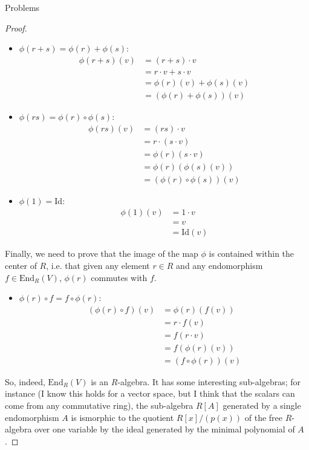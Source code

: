 \documentclass[12pt]{article}
\theoremstyle{definition}
\begin{document}
\begin{section}{Problems}
\begin{proof}
		\begin{itemize}
			\item $\phi(r + s) = \phi(r) + \phi(s)$: 
				\begin{align*}
					\phi(r+s)(v) &= (r + s) \cdot v\\
					&= r \cdot v + s \cdot v\\
					&= \phi(r)(v) + \phi(s)(v)\\
					&= (\phi(r) + \phi(s))(v)
				\end{align*}
			\item $\phi(rs) = \phi(r) \circ \phi(s)$:
				\begin{align*}
					\phi(rs)(v) &= (rs) \cdot v\\
					&= r \cdot (s \cdot v)\\
					&= \phi(r)(s \cdot v)\\
					&= \phi(r)(\phi(s)(v))\\
					&= (\phi(r) \circ \phi(s))(v)
				\end{align*}
			\item $\phi(1) = \text{Id}$:
				\begin{align*}
					\phi(1)(v) &= 1 \cdot v\\
					&= v\\
					&= \text{Id}(v)
				\end{align*}
		\end{itemize}
		Finally, we need to prove that the image of the map $\phi$ is contained within the center of $R$, i.e. that given any element $r \in R$ and any endomorphism $f \in \text{End}_R(V)$, $\phi(r)$ commutes with $f$. 
		\begin{itemize}
			\item $\phi(r) \circ f = f \circ \phi(r)$:
				\begin{align*}
					(\phi(r) \circ f)(v) &= \phi(r)(f(v))\\
					&= r \cdot f(v)\\
					&= f(r \cdot v)\\
					&= f(\phi(r)(v))\\
					&= (f \circ \phi(r))(v)
				\end{align*}
		\end{itemize}
		So, indeed, $\text{End}_R(V)$ is an $R$-algebra. It has some interesting sub-algebras; for instance (I know this holds for a vector space, but I think that the scalars can come from any commutative ring), the sub-algebra $R[A]$ generated by a single endomorphism $A$ is ismorphic to the quotient $R[x]/(p(x))$ of the free $R$-algebra over one variable by the ideal generated by the minimal polynomial of $A$. 
	\end{proof}
\end{section}
\end{document}
